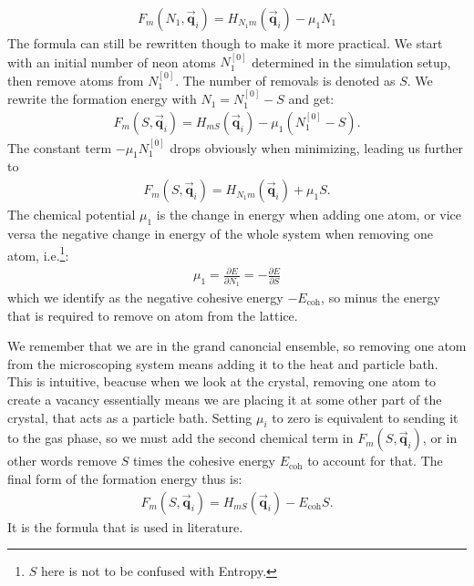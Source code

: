 \begin{align}
	F_m(N_1,\vec{\mathbf{q}}_{i}) = H_{N_1m}(\vec{\mathbf{q}}_{i}) - \mu_1 N_1
\end{align}
The formula can still be rewritten though to make it more practical. We start with an initial number of neon atoms $N_{1}^{[0]}$ determined in the simulation setup, then remove atoms from $N_{1}^{[0]}$. The number of removals is denoted as $S$. We rewrite the formation energy with $N_1 = N_{1}^{[0]}-S$ and get:
\begin{align}
	F_m(S,\vec{\mathbf{q}}_{i}) = H_{mS}(\vec{\mathbf{q}}_{i}) - \mu_1 (N_{1}^{[0]}-S).
\end{align}
The constant term $-\mu_1 N_1^{[0]}$ drops obviously when minimizing, leading us further to
\begin{align}
	F_m(S,\vec{\mathbf{q}}_{i}) = H_{N_1m}(\vec{\mathbf{q}}_{i}) + \mu_1 S.
\end{align}
The chemical potential $\mu_1$ is the change in energy when adding one atom, or vice versa the negative change in energy of the whole system when removing one atom, i.e.\footnote{$S$ here is not to be confused with Entropy.}:
\begin{align}
	\mu_1 =\frac{\partial E}{\partial N_1} = - \frac{\partial E}{\partial S} 
\end{align} which we identify as the negative cohesive energy $-E_{\text{coh}}$, so minus the energy that is required to remove on atom from the lattice.

We remember that we are in the grand canoncial ensemble, so removing one atom from the microscoping system means adding it to the heat and particle bath. This is intuitive, beacuse when we look at the crystal, removing one atom to create a vacancy essentially means we are placing it at some other part of the crystal, that acts as a particle bath. Setting $\mu_i$ to zero is equivalent to sending it to the gas phase, so we must add the second chemical term in $F_m(S,\vec{\mathbf{q}}_i)$, or in other words remove $S$ times the cohesive energy $E_{\text{coh}}$ to account for that. The final form of the formation energy thus is:
\begin{align}
	F_m(S,\vec{\mathbf{q}}_{i}) = H_{mS}(\vec{\mathbf{q}}_{i}) - E_{\text{coh}} S.	
\end{align}It is the formula that is used in literature. %
